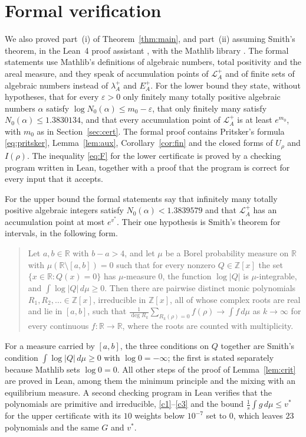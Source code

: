 \documentclass[11pt]{amsart}
\theoremstyle{remark}
\numberwithin{equation}{section}
\newcommand{\R}{\mathbb{R}}
\newcommand{\Z}{\mathbb{Z}}
\newcommand{\LB}{1.3830134}
\newcommand{\UB}{1.3839579}
\begin{document}
\section{Formal verification}\label{sec:lean}

We also proved part~(i) of Theorem~\ref{thm:main}, and part~(ii) assuming Smith's theorem, in the Lean~4 proof assistant \cite{Lean4}, with the Mathlib library \cite{Mathlib}. The formal statements use Mathlib's definitions of algebraic numbers, total positivity and the areal measure, and they speak of accumulation points of $\mathcal L_A^+$ and of finite sets of algebraic numbers instead of $\lambda_A^+$ and $E_A^+$. For the lower bound they state, without hypotheses, that for every $\varepsilon>0$ only finitely many totally positive algebraic numbers $\alpha$ satisfy $\log N_0(\alpha)\le m_0-\varepsilon$, that only finitely many satisfy $N_0(\alpha)\le\LB$, and that every accumulation point of $\mathcal L_A^+$ is at least $e^{m_0}$, with $m_0$ as in Section~\ref{sec:cert}. The formal proof contains Pritsker's formula \eqref{eq:pritsker}, Lemma~\ref{lem:aux}, Corollary~\ref{cor:fin} and the closed forms of $U_\rho$ and $I(\rho)$. The inequality \eqref{eq:F} for the lower certificate is proved by a checking program written in Lean, together with a proof that the program is correct for every input that it accepts.

For the upper bound the formal statements say that infinitely many totally positive algebraic integers satisfy $N_0(\alpha)<\UB$ and that $\mathcal L_A^+$ has an accumulation point at most $e^{v^*}$. Their one hypothesis is Smith's theorem \cite[Theorem~1.5]{Smi24} for intervals, in the following form.

\begin{quote}
Let $a,b\in\R$ with $b-a>4$, and let $\mu$ be a Borel probability measure on $\R$ with $\mu(\R\setminus[a,b])=0$ such that for every nonzero $Q\in\Z[x]$ the set $\{x\in\R:Q(x)=0\}$ has $\mu$-measure $0$, the function $\log|Q|$ is $\mu$-integrable, and $\int\log|Q|\,d\mu\ge0$. Then there are pairwise distinct monic polynomials $R_1,R_2,\ldots\in\Z[x]$, irreducible in $\Z[x]$, all of whose complex roots are real and lie in $[a,b]$, such that $\frac1{\deg R_k}\sum_{R_k(\rho)=0}f(\rho)\to\int f\,d\mu$ as $k\to\infty$ for every continuous $f\colon\R\to\R$, where the roots are counted with multiplicity.
\end{quote}
For a measure carried by $[a,b]$, the three conditions on $Q$ together are Smith's condition $\int\log|Q|\,d\mu\ge0$ with $\log0=-\infty$; the first is stated separately because Mathlib sets $\log0=0$. All other steps of the proof of Lemma~\ref{lem:crit} are proved in Lean, among them the minimum principle and the mixing with an equilibrium measure. A second checking program in Lean verifies that the polynomials are primitive and irreducible, \ref{c1}--\ref{c3} and the bound $\frac1s\int g\,d\mu\le v^*$ for the upper certificate with its $10$ weights below $10^{-7}$ set to $0$, which leaves $23$ polynomials and the same $G$ and $v^*$.
\end{document}
